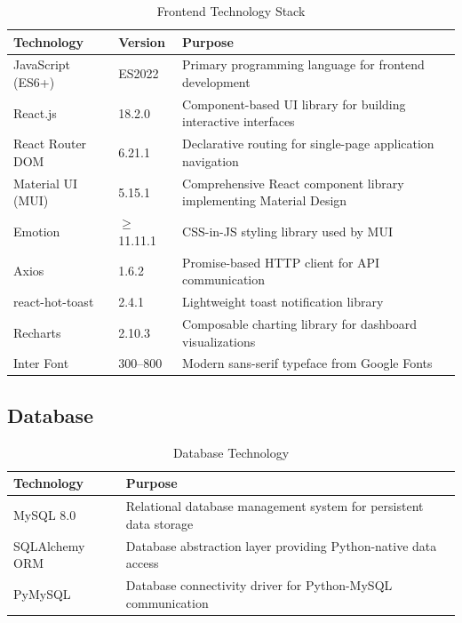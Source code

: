 \begin{table}[H]
  \centering
  \caption{Frontend Technology Stack}
  \label{tab:tech-frontend}
  \begin{tabularx}{\textwidth}{@{}l l X@{}}
    \toprule
    \textbf{Technology} & \textbf{Version} & \textbf{Purpose} \\
    \midrule
    JavaScript (ES6+) & ES2022 & Primary programming language for frontend development \\
    React.js & 18.2.0 & Component-based UI library for building interactive interfaces \\
    React Router DOM & 6.21.1 & Declarative routing for single-page application navigation \\
    Material UI (MUI) & 5.15.1 & Comprehensive React component library implementing Material Design \\
    Emotion & $\geq$11.11.1 & CSS-in-JS styling library used by MUI \\
    Axios & 1.6.2 & Promise-based HTTP client for API communication \\
    react-hot-toast & 2.4.1 & Lightweight toast notification library \\
    Recharts & 2.10.3 & Composable charting library for dashboard visualizations \\
    Inter Font & 300--800 & Modern sans-serif typeface from Google Fonts \\
    \bottomrule
  \end{tabularx}
\end{table}

\subsection{Database}

\begin{table}[H]
  \centering
  \caption{Database Technology}
  \label{tab:tech-database}
  \begin{tabularx}{\textwidth}{@{}l X@{}}
    \toprule
    \textbf{Technology} & \textbf{Purpose} \\
    \midrule
    MySQL 8.0 & Relational database management system for persistent data storage \\
    SQLAlchemy ORM & Database abstraction layer providing Python-native data access \\
    PyMySQL & Database connectivity driver for Python-MySQL communication \\
    \bottomrule
  \end{tabularx}
\end{table}

